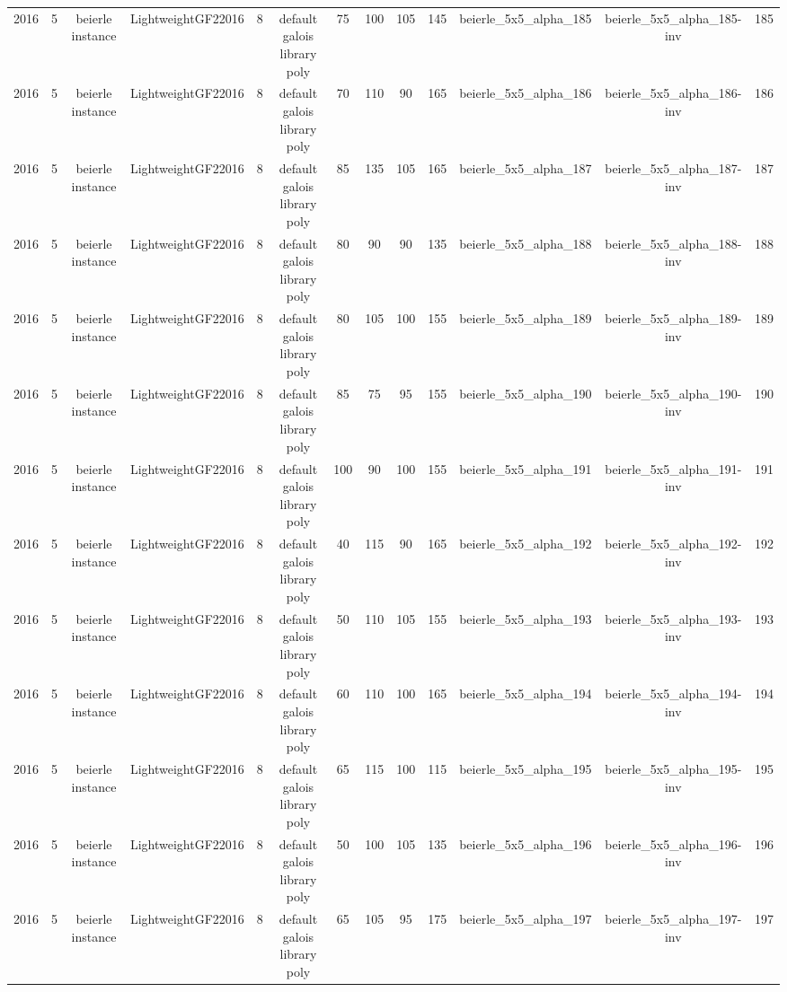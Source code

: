 \begin{tabular}{c c c c c c c c c c c c c}
2016 & 5 & beierle instance & LightweightGF22016 & 8 & default galois library poly & 75 & 100 & 105 & 145 & beierle_5x5_alpha_185 & beierle_5x5_alpha_185-inv & 185 \\
2016 & 5 & beierle instance & LightweightGF22016 & 8 & default galois library poly & 70 & 110 & 90 & 165 & beierle_5x5_alpha_186 & beierle_5x5_alpha_186-inv & 186 \\
2016 & 5 & beierle instance & LightweightGF22016 & 8 & default galois library poly & 85 & 135 & 105 & 165 & beierle_5x5_alpha_187 & beierle_5x5_alpha_187-inv & 187 \\
2016 & 5 & beierle instance & LightweightGF22016 & 8 & default galois library poly & 80 & 90 & 90 & 135 & beierle_5x5_alpha_188 & beierle_5x5_alpha_188-inv & 188 \\
2016 & 5 & beierle instance & LightweightGF22016 & 8 & default galois library poly & 80 & 105 & 100 & 155 & beierle_5x5_alpha_189 & beierle_5x5_alpha_189-inv & 189 \\
2016 & 5 & beierle instance & LightweightGF22016 & 8 & default galois library poly & 85 & 75 & 95 & 155 & beierle_5x5_alpha_190 & beierle_5x5_alpha_190-inv & 190 \\
2016 & 5 & beierle instance & LightweightGF22016 & 8 & default galois library poly & 100 & 90 & 100 & 155 & beierle_5x5_alpha_191 & beierle_5x5_alpha_191-inv & 191 \\
2016 & 5 & beierle instance & LightweightGF22016 & 8 & default galois library poly & 40 & 115 & 90 & 165 & beierle_5x5_alpha_192 & beierle_5x5_alpha_192-inv & 192 \\
2016 & 5 & beierle instance & LightweightGF22016 & 8 & default galois library poly & 50 & 110 & 105 & 155 & beierle_5x5_alpha_193 & beierle_5x5_alpha_193-inv & 193 \\
2016 & 5 & beierle instance & LightweightGF22016 & 8 & default galois library poly & 60 & 110 & 100 & 165 & beierle_5x5_alpha_194 & beierle_5x5_alpha_194-inv & 194 \\
2016 & 5 & beierle instance & LightweightGF22016 & 8 & default galois library poly & 65 & 115 & 100 & 115 & beierle_5x5_alpha_195 & beierle_5x5_alpha_195-inv & 195 \\
2016 & 5 & beierle instance & LightweightGF22016 & 8 & default galois library poly & 50 & 100 & 105 & 135 & beierle_5x5_alpha_196 & beierle_5x5_alpha_196-inv & 196 \\
2016 & 5 & beierle instance & LightweightGF22016 & 8 & default galois library poly & 65 & 105 & 95 & 175 & beierle_5x5_alpha_197 & beierle_5x5_alpha_197-inv & 197 \\

\end{tabular}
